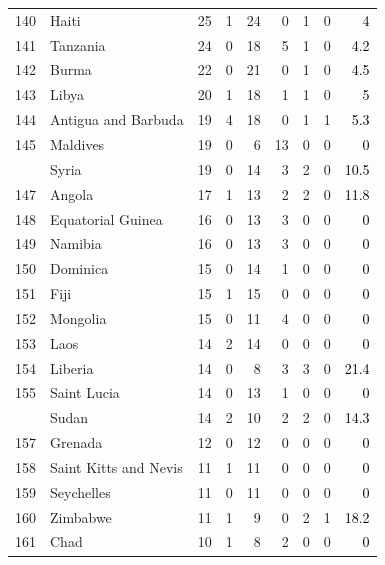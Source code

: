 \documentclass[12pt, a4paper,oneside]{book}
\theoremstyle{definition}
\begin{document}
\begin{longtable}{llrrrrrrr}
	140 & Haiti & 25 & 1 & 24 & 0 & 1 & 0 & \textcolor{black}{4}\\
	\addlinespace
	\rowcolor{gray!6}  141 & Tanzania & 24 & 0 & 18 & 5 & 1 & 0 & \textcolor{black}{4.2}\\
	142 & Burma & 22 & 0 & 21 & 0 & 1 & 0 & \textcolor{black}{4.5}\\
	\rowcolor{gray!6}  143 & Libya & 20 & 1 & 18 & 1 & 1 & 0 & \textcolor{black}{5}\\
	144 & Antigua and Barbuda & 19 & 4 & 18 & 0 & 1 & 1 & \textcolor{black}{5.3}\\
	\rowcolor{gray!6}  145 & Maldives & 19 & 0 & 6 & 13 & 0 & 0 & \textcolor{black}{0}\\
	\addlinespace
	146 & Syria & 19 & 0 & 14 & 3 & 2 & 0 & \textcolor{black}{10.5}\\
	\rowcolor{gray!6}  147 & Angola & 17 & 1 & 13 & 2 & 2 & 0 & \textcolor{black}{11.8}\\
	148 & Equatorial Guinea & 16 & 0 & 13 & 3 & 0 & 0 & \textcolor{black}{0}\\
	\rowcolor{gray!6}  149 & Namibia & 16 & 0 & 13 & 3 & 0 & 0 & \textcolor{black}{0}\\
	150 & Dominica & 15 & 0 & 14 & 1 & 0 & 0 & \textcolor{black}{0}\\
	\addlinespace
	\rowcolor{gray!6}  151 & Fiji & 15 & 1 & 15 & 0 & 0 & 0 & \textcolor{black}{0}\\
	152 & Mongolia & 15 & 0 & 11 & 4 & 0 & 0 & \textcolor{black}{0}\\
	\rowcolor{gray!6}  153 & Laos & 14 & 2 & 14 & 0 & 0 & 0 & \textcolor{black}{0}\\
	154 & Liberia & 14 & 0 & 8 & 3 & 3 & 0 & \textcolor{black}{21.4}\\
	\rowcolor{gray!6}  155 & Saint Lucia & 14 & 0 & 13 & 1 & 0 & 0 & \textcolor{black}{0}\\
	\addlinespace
	156 & Sudan & 14 & 2 & 10 & 2 & 2 & 0 & \textcolor{black}{14.3}\\
	\rowcolor{gray!6}  157 & Grenada & 12 & 0 & 12 & 0 & 0 & 0 & \textcolor{black}{0}\\
	158 & Saint Kitts and Nevis & 11 & 1 & 11 & 0 & 0 & 0 & \textcolor{black}{0}\\
	\rowcolor{gray!6}  159 & Seychelles & 11 & 0 & 11 & 0 & 0 & 0 & \textcolor{black}{0}\\
	160 & Zimbabwe & 11 & 1 & 9 & 0 & 2 & 1 & \textcolor{black}{18.2}\\
	\addlinespace
	\rowcolor{gray!6}  161 & Chad & 10 & 1 & 8 & 2 & 0 & 0 & \textcolor{black}{0}\\

\end{longtable}
\end{document}
